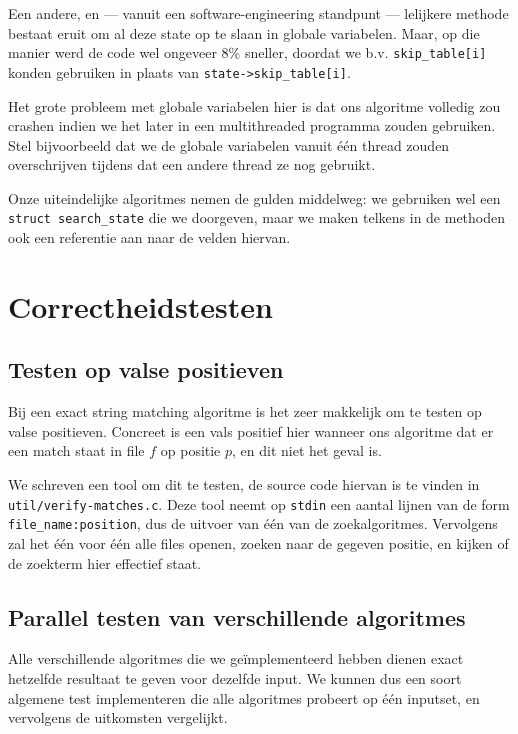 \documentclass[a4paper,11pt]{article}
\begin{document}
Een andere, en — vanuit een software-engineering standpunt — lelijkere methode
bestaat eruit om al deze state op te slaan in globale variabelen. Maar, op die
manier werd de code wel ongeveer 8\% sneller, doordat we b.v.
\verb#skip_table[i]# konden gebruiken in plaats van \verb#state->skip_table[i]#.

Het grote probleem met globale variabelen hier is dat ons algoritme volledig zou
crashen indien we het later in een multithreaded programma zouden gebruiken.
Stel bijvoorbeeld dat we de globale variabelen vanuit \'e\'en thread zouden
overschrijven tijdens dat een andere thread ze nog gebruikt.

Onze uiteindelijke algoritmes nemen de gulden middelweg: we gebruiken wel een
\verb#struct search_state# die we doorgeven, maar we maken telkens in de
methoden ook een referentie aan naar de velden hiervan.

\section{Correctheidstesten}

\subsection{Testen op valse positieven}

Bij een exact string matching algoritme is het zeer makkelijk om te testen op
valse positieven. Concreet is een vals positief hier wanneer ons algoritme dat
er een match staat in file $f$ op positie $p$, en dit niet het geval is.

We schreven een tool om dit te testen, de source code hiervan is te vinden in
\verb#util/verify-matches.c#. Deze tool neemt op \verb#stdin# een aantal lijnen
van de form \verb#file_name:position#, dus de uitvoer van \'e\'en van de
zoekalgoritmes. Vervolgens zal het \'e\'en voor \'e\'en alle files openen,
zoeken naar de gegeven positie, en kijken of de zoekterm hier effectief staat.

\subsection{Parallel testen van verschillende algoritmes}

Alle verschillende algoritmes die we ge\"implementeerd hebben dienen exact
hetzelfde resultaat te geven voor dezelfde input. We kunnen dus een soort
algemene test implementeren die alle algoritmes probeert op \'e\'en inputset, en
vervolgens de uitkomsten vergelijkt.
\end{document}
